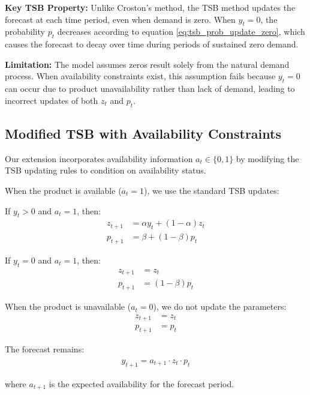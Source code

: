 \documentclass[11pt]{amsart}
\theoremstyle{definition}
\begin{document}
\textbf{Key TSB Property:} Unlike Croston's method, the TSB method updates the forecast at each time period, even when 
demand is zero. When $y_t = 0$, the probability $p_t$ decreases according to equation \eqref{eq:tsb_prob_update_zero}, 
which causes the forecast to decay over time during periods of sustained zero demand.

\textbf{Limitation:} The model assumes zeros result solely from the natural demand process. When availability 
constraints exist, this assumption fails because $y_t = 0$ can occur due to product unavailability rather than 
lack of demand, leading to incorrect updates of both $z_t$ and $p_t$.

\subsection{Modified TSB with Availability Constraints}

Our extension incorporates availability information $a_t \in \{0, 1\}$ by modifying the TSB updating rules to condition 
on availability status.

When the product is available ($a_t = 1$), we use the standard TSB updates:

If $y_t > 0$ and $a_t = 1$, then:
\begin{align}
z_{t+1} &= \alpha y_t + (1-\alpha) z_t \label{eq:modified_demand_update}\\
p_{t+1} &= \beta + (1-\beta) p_t \label{eq:modified_prob_update_nonzero}
\end{align}

If $y_t = 0$ and $a_t = 1$, then:
\begin{align}
z_{t+1} &= z_t \label{eq:modified_demand_no_update}\\
p_{t+1} &= (1-\beta) p_t \label{eq:modified_prob_update_zero}
\end{align}

When the product is unavailable ($a_t = 0$), we do not update the parameters:
\begin{align}
z_{t+1} &= z_t \label{eq:modified_demand_unavailable}\\
p_{t+1} &= p_t \label{eq:modified_prob_unavailable}
\end{align}

The forecast remains:
\begin{align}
\hat{y}_{t+1} = a_{t+1} \cdot z_t \cdot p_t \label{eq:modified_forecast}
\end{align}

where $a_{t+1}$ is the expected availability for the forecast period.
\end{document}
